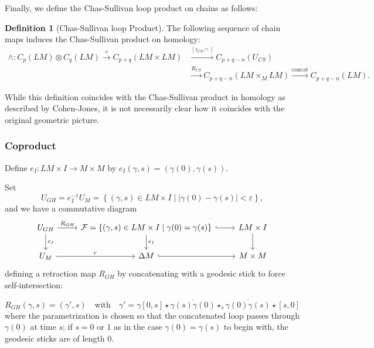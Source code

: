 \documentclass[reqno]{amsart}
\theoremstyle{definition}
\newtheorem{definition}[theorem]{Definition}
\theoremstyle{remark}
\begin{document}
 Finally, we define the Chas-Sullivan loop product on chains as
 follows:

 \begin{definition}[Chas-Sullivan loop Product]
     The following sequence of chain maps induces the Chas-Sullivan
     product on homology:
     \begin{align*}
         \wedge \colon C_p (LM) \otimes C_{q} (LM) 
         \stackrel{\times }{\to} C_{p+q}(LM \times LM) 
         &\stackrel{\left[ \tau_{CS} \cap \right] }{\to} 
         C_{p+q-n}(U_{CS}) \\
         &\stackrel{R_{CS}}{\to} C_{p+q-n}\left( LM \times_M LM \right) 
         \stackrel{\text{concat}}{\to} C_{p+q-n}(LM).
     \end{align*}
 \end{definition}


 While this definition coincides with the Chas-Sullivan product
 in homology as described by
 Cohen-Jones, it is not necessarily clear how it coincides with the
 original geometric picture.



 \subsubsection{Coproduct}
 
 Define
 $e_I \colon LM \times I \to M \times M$ by
 $e_I\left( \gamma, s \right) = \left( \gamma(0) , \gamma(s) \right) $.

 Set 
 \[
 U_{GH} = e_{I}^{-1} U_M = 
 \left\{ \left( \gamma, s \right) \in LM \times I  \mid 
 \left| \gamma(0) - \gamma(s) \right| < \varepsilon \right\} , 
 \] 
 and we have a commutative diagram
 \begin{equation*}
 \begin{tikzcd}
     U_{GH} \ar[r, "R_{GH}"] \ar[d, "e_I"] & 
     \mathcal{F} = \left\{ \left( \gamma, s \right) \in LM \times I  \mid 
 \gamma(0) = \gamma(s) \right\} \ar[r, hookrightarrow] 
 \ar[d, "e_I"] & LM \times I 
 \ar[d] \\
 U_M \ar[r, "r"] & \Delta M \ar[r, hookrightarrow] & 
 M \times M
 \end{tikzcd}
 \end{equation*}
 defining a retraction map
 $R_{GH}$ by concatenating with a geodesic stick to force self-intersection:

 \[
 R_{GH}(\gamma, s) = \left( \gamma', s \right) \quad
 \text{with} \quad
 \gamma' = \gamma \left[ 0,s \right] \star
 \overline{\gamma(s) \gamma(0)} \star_s 
 \overline{\gamma(0) \gamma(s)} \star
 \left[ s,0 \right] 
 \] 
 where the parametrization is chosen so that the concatenated loop
 passes through $\gamma(0)$ at time $s$; if $s = 0$ or $1$ as
 in the case $\gamma(0) = \gamma(s)$ to begin with, the
 geodesic sticks are of length $0$.
\end{document}
